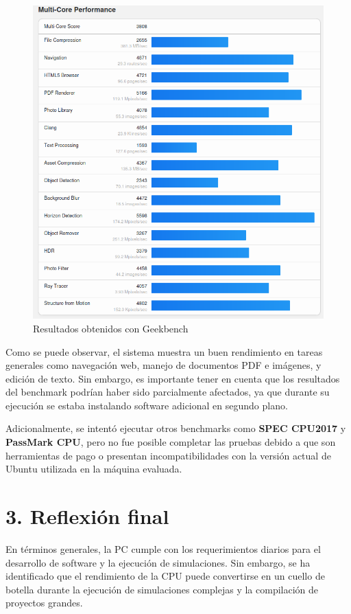 \begin{figure}[H]
    \centering
    \includegraphics[width=0.7\linewidth]{img/rendimientoGeek.png}
    \caption{Resultados obtenidos con Geekbench}
    \label{fig:resultado-geekbench}
\end{figure}

Como se puede observar, el sistema muestra un buen rendimiento en tareas generales como navegación web, manejo de documentos PDF e imágenes, y edición de texto. Sin embargo, es importante tener en cuenta que los resultados del benchmark podrían haber sido parcialmente afectados, ya que durante su ejecución se estaba instalando software adicional en segundo plano.

Adicionalmente, se intentó ejecutar otros benchmarks como \textbf{SPEC CPU2017} y \textbf{PassMark CPU}, pero no fue posible completar las pruebas debido a que son herramientas de pago o presentan incompatibilidades con la versión actual de Ubuntu utilizada en la máquina evaluada.

\section*{3. Reflexión final}
En términos generales, la PC cumple con los requerimientos diarios para el desarrollo de software y la ejecución de simulaciones. Sin embargo, se ha identificado que el rendimiento de la CPU puede convertirse en un cuello de botella durante la ejecución de simulaciones complejas y la compilación de proyectos grandes.
